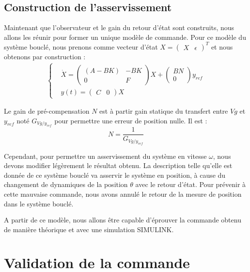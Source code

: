 \subsection{Construction de l'asservissement}\label{sub:constructionAsservissement}
Maintenant que l'observateur et le gain du retour d'état sont construits, nous allons les réunir pour former un unique modèle de commande. Pour ce modèle du système bouclé, nous prenons comme vecteur d'état $X=\begin{pmatrix}
X&\epsilon
\end{pmatrix}^T$ et nous obtenons par construction :
\begin{align*}
\label{eqn:systemeEE2_bf}
\left\lbrace
\begin{aligned}
& \dot{X} = \begin{pmatrix}
(A-BK) & -BK\\
0& F
\end{pmatrix}X+\begin{pmatrix}
BN\\0
\end{pmatrix}y_{ref} \\
& y(t) = \begin{pmatrix}
C & 0
\end{pmatrix}X
\end{aligned}
\right.
\end{align*} 

Le gain de pré-compensation $N$ est à partir gain statique du transfert entre $Vg$ et $y_{ref}$ noté $G_{Vg/y_{ref}}$ pour permettre une erreur de position nulle. Il est : 
\begin{equation}
N = \frac{1}{G_{Vg/y_{ref}}}
\end{equation}


Cependant, pour permettre un asservissement du système en vitesse $\omega$, nous devons modifier légèrement le résultat obtenu. La description telle qu'elle est donnée de ce système bouclé va asservir le système en position, à cause du changement de dynamiques de la position $\theta$ avec le retour d'état. Pour prévenir à cette mauvaise commande, nous avons annulé le retour de la mesure de position dans le système bouclé. 


A partir de ce modèle, nous allons être capable d'éprouver la commande obtenu de manière théorique et avec une simulation SIMULINK.

\section{Validation de la commande}
